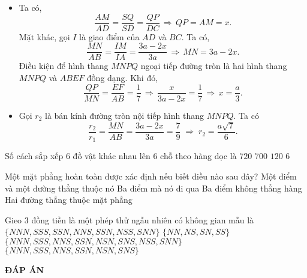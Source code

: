 \begin{ex}
{\begin{itemize}
	\item Ta có, 
	\[\dfrac{AM}{AD}=\dfrac{SQ}{SD}=\dfrac{QP}{DC} \,\Rightarrow\, QP=AM=x.\]
	Mặt khác, gọi $I$ là giao điểm của $AD$ và $BC$. Ta có,
	\[\dfrac{MN}{AB}=\dfrac{IM}{IA}=\dfrac{3a-2x}{3a} \,\Rightarrow\, MN=3a-2x.\]
	Điều kiện để hình thang $MNPQ$ ngoại tiếp đường tròn là hai hình thang $MNPQ$ và $ABEF$ đồng dạng. Khi đó,
	\[\dfrac{QP}{MN}=\dfrac{EF}{AB}=\dfrac{1}{7} \,\Rightarrow\, \dfrac{x}{3a-2x}=\dfrac{1}{7} \,\Rightarrow\, x=\dfrac{a}{3}.\]
	\item Gọi $r_2$ là bán kính 
	đường tròn nội tiếp hình thang $MNPQ$. Ta có
	\[\dfrac{r_2}{r_1}=\dfrac{MN}{AB}=\dfrac{3a-2x}{3a}=\dfrac{7}{9} \;\Rightarrow\; r_2=\dfrac{a\sqrt{7}}{6}.\]
\end{itemize}
}
\end{ex}
\begin{ex}%
	Số cách sắp xếp $6$ đồ vật khác nhau lên $6$ chỗ theo hàng dọc là
	\choice
	{\True $720$}
	{$700$}
	{$120$}
	{$6$}
\end{ex}
\begin{ex}%
	Một mặt phẳng hoàn toàn được xác định nếu biết điều nào sau đây?
	\choice
	{Một điểm và một đường thẳng thuộc nó}
	{Ba điểm mà nó đi qua}
	{\True Ba điểm không thẳng hàng}
	{Hai đường thẳng thuộc mặt phẳng}
\end{ex}
\begin{ex}%
	Gieo $3$ đồng tiền là một phép thử ngẫu nhiên có không gian mẫu là
	\choice
	{$\{NNN,SSS,SSN,NNS,SSN,NSS,SNN\}$}
	{$\{NN,NS,SN,SS\}$}
	{\True $\{NNN,SSS,NNS,SSN,NSN,SNS,NSS,SNN\}$}
	{$\{NNN,SSS,NNS,SSN,NSN,SNS\}$}
\end{ex}

\newpage
\begin{center}
	\textbf{ĐÁP ÁN}
\end{center}
\begin{multicols}{6}
	
\end{multicols}